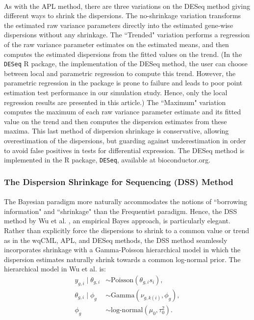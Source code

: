 \documentclass[10pt]{article}
\begin{document}
\paragraph{} \indent As with the APL method, there are three variations on the DESeq method giving different ways to shrink the dispersions. The no-shrinkage variation transforms the estimated raw variance parameters directly into the estimated gene-wise dispersions without any shrinkage. The ``Trended" variation performs a regression of the raw variance parameter estimates on the estimated means, and then computes the estimated dispersions from the fitted values on the trend. (In the {\tt DESeq} R package, the implementation of the DESeq method, the user can choose between local and parametric regression to compute this trend. However, the parametric regression in the package is prone to failure and leads to poor point estimation test performance in our simulation study. Hence, only the local regression results are presented in this article.) The ``Maximum" variation computes the maximum of each raw variance parameter estimate and its fitted value on the trend and then computes the dispersion estimates from these maxima. This last method of dispersion shrinkage is conservative, allowing overestimation of the dispersions, but guarding against underestimation in order to avoid false positives in tests for differential expression. The DESeq method is implemented in the R package, {\tt DESeq}, available at {bioconductor.org}.

\subsubsection*{The Dispersion Shrinkage for Sequencing (DSS) Method}

\paragraph{} \indent The Bayesian paradigm more naturally accommodates the notions of ``borrowing information" and ``shrinkage" than the Frequentist paradigm. Hence, the DSS method by Wu et al. \cite{dss}, an empirical Bayes approach, is particularly elegant. Rather than explicitly force the dispersions to shrink to a common value or trend as in the wqCML, APL, and DESeq methods, the DSS method seamlessly incorporates shrinkage with a Gamma-Poisson hierarchical model in which the dispersion estimates naturally shrink towards a common log-normal prior. The hierarchical model in Wu et al. \cite{dss} is:
\begin{align*}
y_{g, i} \mid \theta_{g, i} &\sim \text{Poisson}(\theta_{g, i} s_i), \\
\theta_{g, i} \mid \phi_g &\sim \text{Gamma}(\nu_{g, k(i)}, \phi_g), \\
\phi_g &\sim \text{log-normal}(\mu_0, \tau_0^2).
\end{align*}
\end{document}
